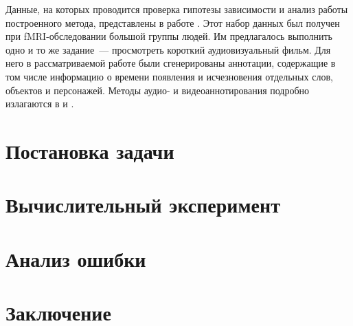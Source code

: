 \documentclass[a4paper, 12pt]{article}
\begin{document}

	

	Данные, на которых проводится проверка гипотезы зависимости и анализ работы построенного метода,
	представлены в работе \citep{Berezutskaya2022}. Этот набор данных был получен при
	fMRI-обследовании большой группы людей. Им предлагалось выполнить одно и то же задание~---
	просмотреть короткий аудиовизуальный фильм. Для него в рассматриваемой работе были 
	сгенерированы аннотации, содержащие в том числе информацию о времени появления и исчезновения
	отдельных слов, объектов и персонажей. Методы аудио- и видеоаннотирования подробно излагаются в
	\citep{boersma2018praat} и \citep{Berezutskaya2020}. 

\section{Постановка задачи}

\section{Вычислительный эксперимент}

\section{Анализ ошибки}

\section{Заключение}



\end{document}
